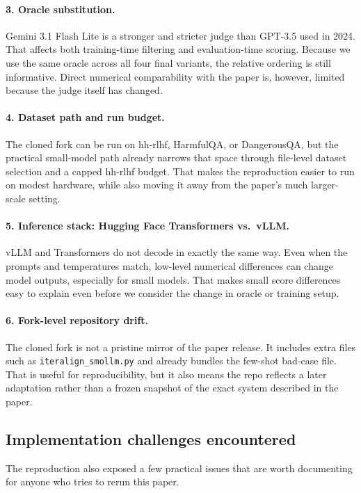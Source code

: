 \documentclass[11pt]{article}
\begin{document}
\paragraph{3. Oracle substitution.}
Gemini 3.1 Flash Lite is a stronger and stricter judge than GPT-3.5 used in 2024. That affects both training-time filtering and evaluation-time scoring. Because we use the same oracle across all four final variants, the relative ordering is still informative. Direct numerical comparability with the paper is, however, limited because the judge itself has changed.

\paragraph{4. Dataset path and run budget.}
The cloned fork can be run on hh-rlhf, HarmfulQA, or DangerousQA, but the practical small-model path already narrows that space through file-level dataset selection and a capped hh-rlhf budget. That makes the reproduction easier to run on modest hardware, while also moving it away from the paper's much larger-scale setting.

\paragraph{5. Inference stack: Hugging Face Transformers vs.\ vLLM.}
vLLM and Transformers do not decode in exactly the same way. Even when the prompts and temperatures match, low-level numerical differences can change model outputs, especially for small models. That makes small score differences easy to explain even before we consider the change in oracle or training setup.

\paragraph{6. Fork-level repository drift.}
The cloned fork is not a pristine mirror of the paper release. It includes extra files such as \texttt{iteralign\_smollm.py} and already bundles the few-shot bad-case file. That is useful for reproducibility, but it also means the repo reflects a later adaptation rather than a frozen snapshot of the exact system described in the paper.

\subsection{Implementation challenges encountered}
The reproduction also exposed a few practical issues that are worth documenting for anyone who tries to rerun this paper.
\end{document}
